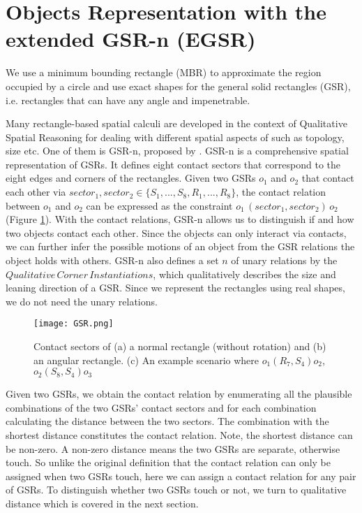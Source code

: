 \documentclass[letterpaper]{article}
\begin{document}
    

\section{Objects Representation with the extended GSR-n (EGSR)} 

We use a minimum bounding rectangle (MBR) to approximate the region occupied by a circle and use exact shapes for the general solid rectangles (GSR), i.e. rectangles that can have any angle and impenetrable. 

Many rectangle-based spatial calculi \cite{balbiani1998model,cohn2012thinking,sokeh2013efficient} are developed in the context of Qualitative Spatial Reasoning for dealing with different spatial aspects of such as topology, size etc. One of them is GSR-n, proposed by \cite{Ge2013}. GSR-n is a comprehensive spatial representation of GSRs. It defines eight contact sectors that correspond to the eight edges and corners of the rectangles. Given two GSRs $o_1$ and $o_2$ that contact each other via $sector_1, sector_2 \in \{S_1, ..., S_8, R_1, ..., R_8\}$, the contact relation between $o_1$ and $o_2$ can be expressed as the constraint $o_1 \, (sector_1, sector_2) \, o_2$ (Figure \ref{GSR}). With the contact relations, GSR-n allows us to distinguish if and how two objects contact each other. Since the objects can only interact via contacts, we can further infer the possible motions of an object from the GSR relations the object holds with others. GSR-n also defines a set $n$ of unary relations by the $Qualitative\,Corner\,Instantiations$, which qualitatively describes the size and leaning direction of a GSR. Since we represent the rectangles using real shapes, we do not need the unary relations. 
\begin{figure}[h!]
\centering\texttt{[image: GSR.png]}\caption{Contact sectors of (a) a normal rectangle (without rotation) and (b) an angular rectangle. (c) An example scenario where $o_1 (R_7, S_4) o_2$, $o_2 (S_8, S_4) o_3$}
\label{GSR}
\end{figure}

Given two GSRs, we obtain the contact relation by enumerating all the plausible combinations of the two GSRs' contact sectors and for each combination calculating the distance between the two sectors. The combination with the shortest distance constitutes the contact relation. Note, the shortest distance can be non-zero. A non-zero distance means the two GSRs are separate, otherwise touch. So unlike the original definition that the contact relation can only be assigned when two GSRs touch, here we can assign a contact relation for any pair of GSRs. To distinguish whether two GSRs touch or not, we turn to qualitative distance which is covered in the next section.
\end{document}
